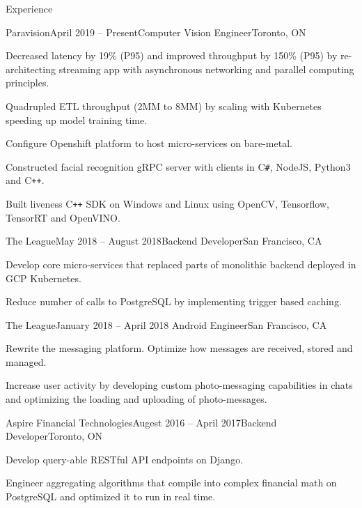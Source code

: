 \documentclass{resume}
\begin{document}
  \begin{rSection}{Experience}

    \begin{rSubsection}{Paravision}{April 2019 – Present}{Computer Vision Engineer}{Toronto, ON}
    \item Decreased latency by 19\% (P95) and improved throughput by 150\% (P95) by re-architecting streaming app with asynchronous networking and parallel computing principles.
    \item Quadrupled ETL throughput (2MM to 8MM) by scaling with Kubernetes speeding up model training time.
    \item Configure Openshift platform to host micro-services on bare-metal.
    \item Constructed facial recognition gRPC server with clients in C\texttt{\#}, NodeJS, Python3 and C\texttt{++}.
    \item Built liveness C\texttt{++} SDK on Windows and Linux using OpenCV, Tensorflow, TensorRT and OpenVINO.
    \end{rSubsection}
    \vspace{-1em}
    \begin{rSubsection}{The League}{May 2018 – August 2018}{Backend Developer}{San Francisco, CA}
    \item Develop core micro-services that replaced parts of monolithic backend deployed in GCP Kubernetes.
    \item Reduce number of calls to PostgreSQL by implementing trigger based caching.
    \end{rSubsection}
    \vspace{-1em}
    \begin{rSubsection}{The League}{January 2018 – April 2018 }{Android Engineer}{San Francisco, CA}
    \item Rewrite the messaging platform. Optimize how messages are received, stored and managed.
    \item Increase user activity by developing custom photo-messaging capabilities in chats and optimizing the loading and uploading of photo-messages.
    \end{rSubsection}
    \vspace{-1em}
    \begin{rSubsection}{Aspire Financial Technologies}{Augest 2016 – April 2017}{Backend Developer}{Toronto, ON}
    \item Develop query-able RESTful API endpoints on Django.
    \item Engineer aggregating algorithms that compile into complex financial math on PostgreSQL and optimized it to run in real time.
    \end{rSubsection}
  \end{rSection}
\end{document}
